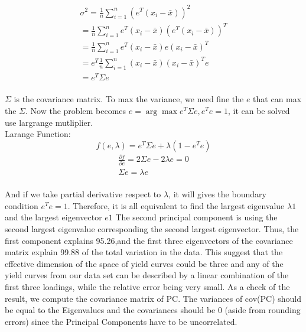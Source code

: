 \documentclass[a4paper,11pt]{article}
\begin{document}
\begin{equation}
\begin{aligned}
\sigma^2=\frac{1}{n}\sum\limits_{i=1}^n (e^T(x_i-\bar x))^2\\
=\frac{1}{n}\sum\limits_{i=1}^n e^T(x_i-\bar x) (e^T(x_i-\bar x))^T\\
=\frac{1}{n}\sum\limits_{i=1}^n e^T(x_i-\bar x)e(x_i-\bar x)^T\\
=e^T\frac{1}{n}\sum\limits_{i=1}^n (x_i-\bar x)(x_i-\bar x)^T e\\
=e^T\Sigma e
\end{aligned}
\end{equation}\\
$\Sigma$ is the covariance matrix. To max the variance, we need fine the $e$ that can max the $\Sigma$. Now the problem becomes $e=\arg\max e^T\Sigma e, e^Te=1$, it can be solved use largrange mutliplier.\\
Larange Function: $$f(e,\lambda)= e^T\Sigma e +\lambda(1-e^Te)$$
\begin{equation}
\begin{aligned}
\frac{\partial f}{\partial e}=2\Sigma e-2\lambda e=0 \\
\Sigma e=\lambda e
\end{aligned}
\end{equation}\\
And if we take partial derivative respect to $\lambda$, it will gives the boundary condition $e^Te=1$.
Therefore, it is all equivalent to find the largest eigenvalue $\lambda 1$ and the largest eigenvector $e1$
The second principal component is  using the second largest eigenvalue corresponding the second largest eigenvector.
Thus, the first component  explains 95.26,and the first three eigenvectors of the covariance matrix explain 99.88 of the total variation in the data.
This suggest that the effective dimension of the space of yield curves could be three and any of the yield
curves from our data set can be described by a linear combination of the first three loadings, while the
relative error being very small.
As a check of the result, we compute the covariance matrix of PC. The variances of cov(PC) should
be equal to the Eigenvalues and the covariances should be 0 (aside from rounding errors) since the
Principal Components have to be uncorrelated.\\
\end{document}
